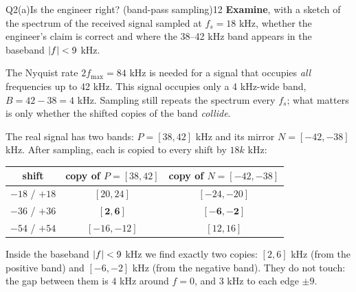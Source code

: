 \begin{qcard}{Q2(a)}{Is the engineer right? (band-pass sampling)}{12}
\textbf{Examine}, with a sketch of the spectrum of the received signal sampled at $f_s=18$ kHz, whether the engineer's claim is correct and where the 38--42 kHz band appears in the baseband $\lvert f\rvert<9$ kHz.
\end{qcard}
\begin{solution}
 The Nyquist rate $2f_{\max}=84$ kHz is needed for a signal that occupies \emph{all} frequencies up to 42 kHz. This signal occupies only a 4 kHz-wide band, $B=42-38=4$ kHz. Sampling still repeats the spectrum every $f_s$; what matters is only whether the shifted copies of the band \emph{collide}.

 The real signal has two bands: $P=[38,42]$ kHz and its mirror $N=[-42,-38]$ kHz. After sampling, each is copied to every shift by $18k$ kHz:
\begin{center}\small\renewcommand{\arraystretch}{1.25}\begin{tabular}{@{}c|cc@{}}\toprule
shift&copy of $P=[38,42]$&copy of $N=[-42,-38]$\\\midrule
$-18$ / $+18$&$[20,24]$&$[-24,-20]$\\
$-36$ / $+36$&$\mathbf{[2,6]}$&$\mathbf{[-6,-2]}$\\
$-54$ / $+54$&$[-16,-12]$&$[12,16]$\\\bottomrule\end{tabular}\end{center}
Inside the baseband $\lvert f\rvert<9$ kHz we find exactly two copies: $[2,6]$ kHz (from the positive band) and $[-6,-2]$ kHz (from the negative band). They do not touch: the gap between them is $4$ kHz around $f=0$, and $3$ kHz to each edge $\pm9$.


\end{solution}
